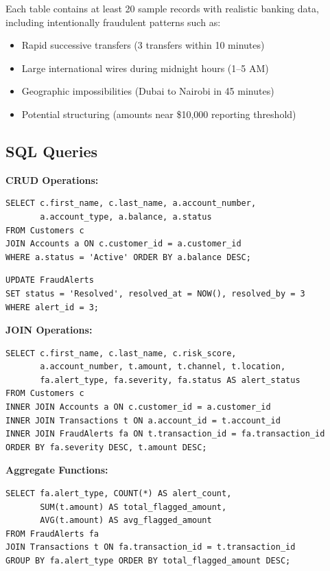 \documentclass[a4paper,12pt]{article}
\begin{document}
Each table contains at least 20 sample records with realistic banking data, including intentionally fraudulent patterns such as:
\begin{itemize}
    \item Rapid successive transfers (3 transfers within 10 minutes)
    \item Large international wires during midnight hours (1--5 AM)
    \item Geographic impossibilities (Dubai to Nairobi in 45 minutes)
    \item Potential structuring (amounts near \$10,000 reporting threshold)
\end{itemize}

\subsection{SQL Queries}

\textbf{CRUD Operations:}
\begin{lstlisting}[style=sqlstyle, caption=SELECT - Active accounts with customer info]
SELECT c.first_name, c.last_name, a.account_number, 
       a.account_type, a.balance, a.status
FROM Customers c 
JOIN Accounts a ON c.customer_id = a.customer_id
WHERE a.status = 'Active' ORDER BY a.balance DESC;
\end{lstlisting}

\begin{lstlisting}[style=sqlstyle, caption=UPDATE - Resolve a fraud alert]
UPDATE FraudAlerts 
SET status = 'Resolved', resolved_at = NOW(), resolved_by = 3
WHERE alert_id = 3;
\end{lstlisting}

\textbf{JOIN Operations:}
\begin{lstlisting}[style=sqlstyle, caption=Multi-table JOIN - Full fraud investigation view]
SELECT c.first_name, c.last_name, c.risk_score,
       a.account_number, t.amount, t.channel, t.location,
       fa.alert_type, fa.severity, fa.status AS alert_status
FROM Customers c
INNER JOIN Accounts a ON c.customer_id = a.customer_id
INNER JOIN Transactions t ON a.account_id = t.account_id
INNER JOIN FraudAlerts fa ON t.transaction_id = fa.transaction_id
ORDER BY fa.severity DESC, t.amount DESC;
\end{lstlisting}

\textbf{Aggregate Functions:}
\begin{lstlisting}[style=sqlstyle, caption=Fraud amounts by alert type with aggregates]
SELECT fa.alert_type, COUNT(*) AS alert_count,
       SUM(t.amount) AS total_flagged_amount, 
       AVG(t.amount) AS avg_flagged_amount
FROM FraudAlerts fa 
JOIN Transactions t ON fa.transaction_id = t.transaction_id
GROUP BY fa.alert_type ORDER BY total_flagged_amount DESC;
\end{lstlisting}
\end{document}
